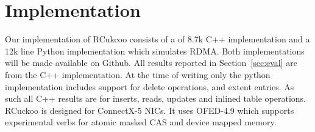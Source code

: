\section{Implementation}

Our implementation of RCukcoo consists of a of 8.7k C++
implementation and a 12k line Python implementation which
simulates RDMA. Both implementations will be made available
on Github.  All results reported in Section~\ref{sec:eval}
are from the C++ implementation. At the time of writing only
the python implementation includes support for delete
operations, and extent entries. As such all C++ results are
for inserts, reads, updates and inlined table operations.
RCuckoo is designed for ConnectX-5 NICs. It uses OFED-4.9
which supports experimental verbs for atomic masked CAS and
device mapped memory. 
